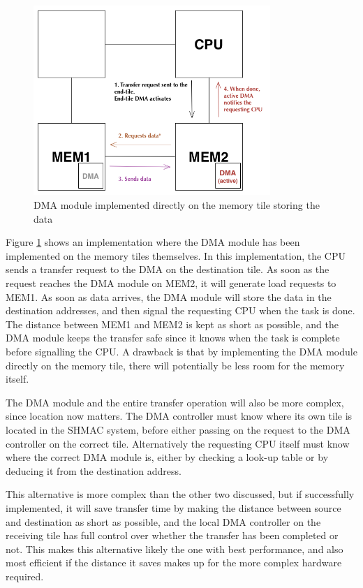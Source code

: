 \begin{figure}[h!]
    \centering
    \includegraphics[width=0.8\textwidth]{Figures/DMA/DMASHMAC3}
    \caption{DMA module implemented directly on the memory tile storing the data}
    \label{fig:DMASHMAC3}
\end{figure}
 
Figure \ref{fig:DMASHMAC3} shows an implementation where the DMA module has been implemented on the memory tiles themselves.
In this implementation, the CPU sends a transfer request to the DMA on the destination tile.
As soon as the request reaches the DMA module on MEM2, it will generate load requests to MEM1.
As soon as data arrives, the DMA module will store the data in the destination addresses, and then signal the requesting CPU when the task is done.
The distance between MEM1 and MEM2 is kept as short as possible, and the DMA module keeps the transfer safe since it knows when the task is complete before signalling the CPU.
A drawback is that by implementing the DMA module directly on the memory tile, there will potentially be less room for the memory itself.

The DMA module and the entire transfer operation will also be more complex, since location now matters.
The DMA controller must know where its own tile is located in the SHMAC system, before either passing on the request to the DMA controller on the correct tile.
Alternatively the requesting CPU itself must know where the correct DMA module is, either by checking a look-up table or by deducing it from the destination address.

This alternative is more complex than the other two discussed, but if successfully implemented, it will save transfer time by making the distance between source and destination as short as possible, and the local DMA controller on the receiving tile has full control over whether the transfer has been completed or not.
This makes this alternative likely the one with best performance, and also most efficient if the distance it saves makes up for the more complex hardware required.

